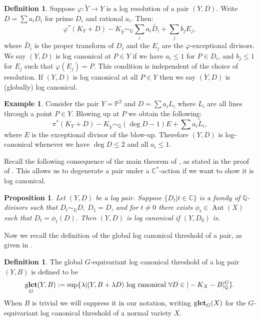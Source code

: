 \documentclass{amsart}
\newtheorem{proposition}[theorem]{Proposition}
\theoremstyle{definition}
\newtheorem{definition}[theorem]{Definition}
\newtheorem{example}[theorem]{Example}
\newcommand{\CC}{\mathbb{C}}
\newcommand{\QQ}{\mathbb{Q}}
\newcommand{\PP}{\mathbb{P}}
\DeclareMathOperator{\Aut}{Aut}
\DeclareMathOperator{\glct}{g\bf{lct}}
\begin{document}
\begin{definition}
Suppose \(\varphi: \tilde{Y} \to Y\) is a log resolution of a pair \((Y,D)\). Write \(D = \sum a_i D_i\) for prime \(D_i\) and rational \(a_i\). Then:
\begin{equation} \label{eq:res}
\varphi^*(K_Y+ D) - K_{\tilde{Y}}\sim_{\QQ} \sum_i a_i \tilde{D_i} + \sum_j b_j E_j,
\end{equation} 
where \(\tilde{D_i}\) is the proper transform of \(D_i\) and the \(E_j\) are the \(\varphi\)-exceptional divisors. We say \((Y,D)\) is log canonical at \(P \in Y\) if we have \(a_i \le 1 \) for \(P \in D_i\), and \(b_j \le 1\) for \(E_j\) such that \(\varphi(E_j) = P\). This condition is independent of the choice of resolution. If \((Y,D)\) is log canonical at all \(P  \in Y\) then we say \((Y,D)\) is (globally) log canonical.
\end{definition}
\begin{example} \label{examplelct}
Consider the pair \(Y = \PP^2\) and \(D = \sum a_i L_i\) where \(L_i\) are all lines through a point \(P \in Y\). Blowing up at \(P\) we obtain the following:
\[
\pi^*(K_Y+D) - K_{\tilde{Y}} \sim_{\QQ} (\deg D - 1) E + \sum a_i \tilde{L}_i,
\]
where \(E\) is the exceptional divisor  of the blow-up. Therefore \((Y,D)\) is log-canonical whenever we have \(\deg D \le 2\) and all \(a_i \le 1\).
\end{example}
Recall the following consequence of the main theorem of \cite{demailly2001}, as stated in the proof of \cite[Lemma 5.1]{cheltsov08}. This allows us to degenerate a pair under a \(\CC^*\)-action if we want to show it is log canonical.
\begin{proposition} \label{degenpair}
Let \((Y,D)\) be a log pair. Suppose \(\{ D_t | t \in \CC\}\) is a family of \(\QQ\)-divisors such that \(D_t \sim_\QQ D\), \(D_1 = D\), and for \(t \neq 0\) there exists \(\phi_t \in \Aut(X)\) such that \(D_t = \phi_t(D)\). Then \((Y,D)\) is log canonical if \((Y,D_0)\) is.
\end{proposition} \label{def:lct}
Now we recall the definition of the global log canonical threshold of a pair, as given in \cite{suess18-2}.
\begin{definition}
The global \(G\)-equivariant log canonical threshold of a log pair \((Y,B)\)  is defined to be
\[
\glct_{G}(Y,B) := \sup \{ \lambda | (Y,B+ \lambda D) \text{ log canonical } \forall D \in | -K_X - B |_{\QQ}^G \}.
\]
When \(B\) is trivial we will suppress it in our notation, writing \(\glct_G(X)\) for the \(G\)-equivariant log canonical threshold of a normal variety \(X\).
\end{definition}
\end{document}
